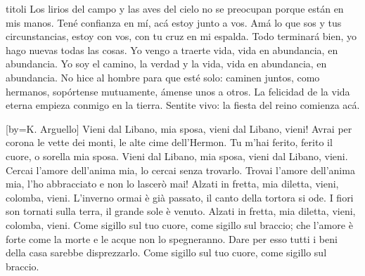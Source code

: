 \begin{songs}{titoli}
\beginverse
Los lirios del campo
y las aves del cielo
no se preocupan
porque están en mis manos.
Tené confianza en mí,
acá estoy junto a vos.
Amá lo que sos y tus circunstancias,
estoy con vos, con tu cruz en mi espalda.
Todo terminará bien,
yo hago nuevas todas las cosas.
\endverse
\beginchorus
Yo vengo a traerte vida,
vida en abundancia, en abundancia.
Yo soy el camino, la verdad y la vida,
vida en abundancia, en abundancia.
\endchorus
\beginverse
No hice al hombre para que esté solo:
caminen juntos, como hermanos,
sopórtense mutuamente,
ámense unos a otros.
La felicidad de la vida eterna
empieza conmigo en la tierra.
Sentite vivo:
la fiesta del reino comienza acá.
\endverse
\endsong

[by={K. Arguello}]
\beginchorus
Vieni dal Libano, mia sposa, vieni dal Libano, vieni!
Avrai per corona le vette dei monti, le alte cime dell'Hermon.
Tu m'hai ferito, ferito il cuore, o sorella mia sposa.
Vieni dal Libano, mia sposa, vieni dal Libano, vieni.
\endchorus
\beginverse*
Cercai l'amore dell'anima mia, lo cercai senza trovarlo.
Trovai l'amore dell'anima mia, l'ho abbracciato e non lo lascerò mai!
\endverse
\beginverse
Alzati in fretta, mia diletta, vieni, colomba, vieni.
L'inverno ormai è già passato, il canto della tortora si ode.
I fiori son tornati sulla terra, il grande sole è venuto.
Alzati in fretta, mia diletta, vieni, colomba, vieni.
\endverse
\beginverse
Come sigillo sul tuo cuore, come sigillo sul braccio;
che l'amore è forte come la morte e le acque non lo spegneranno.
Dare per esso tutti i beni della casa sarebbe disprezzarlo.
Come sigillo sul tuo cuore, come sigillo sul braccio.
\endverse
\endsong

\end{songs}
